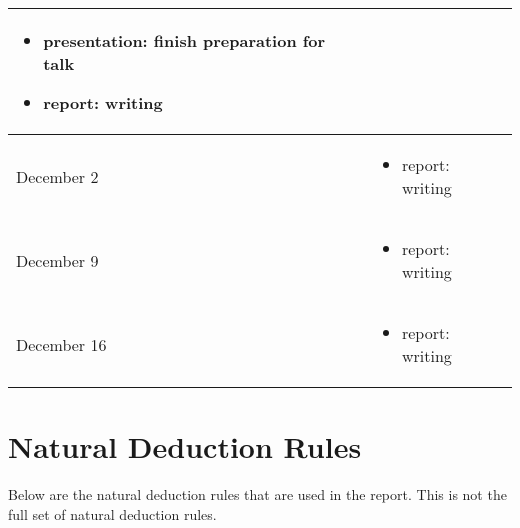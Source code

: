 \documentclass[12pt]{article}
\begin{document}
\begin{center}
\begin{tabular}{ | m{2.5cm} | m{14cm} | }
\begin{itemize}
	\item presentation: finish preparation for talk
	\item report: writing
	\end{itemize} \\  
\hline
December 2 & 
	\begin{itemize}
	\item report: writing
	\end{itemize} \\ 
\hline
December 9 & 
	\begin{itemize}
	\item report: writing
	\end{itemize} \\ 
\hline
December 16 & 
	\begin{itemize}
	\item report: writing
	\end{itemize} \\ 
\hline
\end{tabular}
\end{center}








\appendix

\section{Natural Deduction Rules}
\label{app:rules}

Below are the natural deduction rules that are used in the report. This is not the full set of natural deduction rules.
\end{document}
